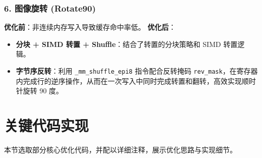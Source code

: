 \documentclass[a4paper]{article}
\begin{document}
\subsubsection{6. 图像旋转 (Rotate90)}
\textbf{优化前}：非连续内存写入导致缓存命中率低。
\textbf{优化后}：
\begin{itemize}
    \item \textbf{分块 + SIMD 转置 + Shuffle}：结合了转置的分块策略和 SIMD 转置逻辑。
    \item \textbf{字节序反转}：利用 \texttt{\_mm\_shuffle\_epi8} 指令配合反转掩码 \texttt{rev\_mask}，在寄存器内完成行的逆序操作，从而在一次写入中同时完成转置和翻转，高效实现顺时针旋转 90 度。
\end{itemize}

\section{关键代码实现}

本节选取部分核心优化代码，并配以详细注释，展示优化思路与实现细节。
\end{document}
